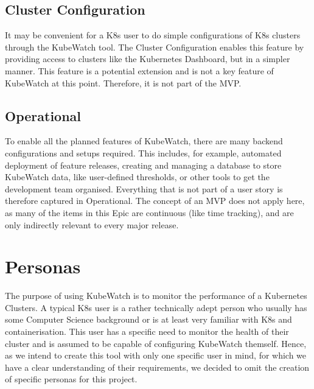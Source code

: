 \subsection{Cluster Configuration}
It may be convenient for a K8s user to do simple configurations of K8s clusters through the KubeWatch tool. The Cluster Configuration enables this feature by providing access to clusters like the Kubernetes Dashboard, but in a simpler manner. This feature is a potential extension and is not a key feature of KubeWatch at this point. Therefore, it is not part of the MVP.

\subsection{Operational}
To enable all the planned features of KubeWatch, there are many backend configurations and setups required. This includes, for example, automated deployment of feature releases, creating and managing a database to store KubeWatch data, like user-defined thresholds, or other tools to get the development team organised. Everything that is not part of a user story is therefore captured in Operational. The concept of an MVP does not apply here, as many of the items in this Epic are continuous (like time tracking), and are only indirectly relevant to every major release.

\section{Personas}

The purpose of using KubeWatch is to monitor the performance of a Kubernetes Clusters. A typical K8s user is a rather technically adept person who usually has some Computer Science background or is at least very familiar with K8s and containerisation. This user has a specific need to monitor the health of their cluster and is assumed to be capable of configuring KubeWatch themself. Hence, as we intend to create this tool with only one specific user in mind, for which we have a clear understanding of their requirements, we decided to omit the creation of specific personas for this project.

